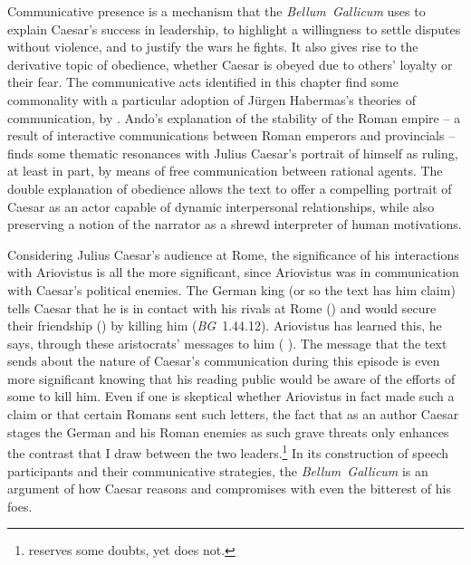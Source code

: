 \documentclass[12pt,letterpaper,oneside,final]{memoir}
\begin{document}
Communicative presence is a mechanism that the \emph{Bellum~Gallicum} uses to explain Caesar's success in leadership, to highlight a willingness to settle disputes without violence, and to justify the wars he fights. It also gives rise to the derivative topic of obedience, whether Caesar is obeyed due to others' loyalty or their fear. The communicative acts identified in this chapter find some commonality with a particular adoption of Jürgen Habermas's theories of communication, by \textcite[73--80]{ando2000}. Ando's explanation of the stability of the Roman empire -- a result of interactive communications between Roman emperors and provincials -- finds some thematic resonances with Julius Caesar's portrait of himself as ruling, at least in part, by means of free communication between rational agents. The double explanation of obedience allows the text to offer a compelling portrait of Caesar as an actor capable of dynamic interpersonal relationships, while also preserving a notion of the narrator as a shrewd interpreter of human motivations.

Considering Julius Caesar's audience at Rome, the significance of his interactions with Ariovistus is all the more significant, since Ariovistus was in communication with Caesar's political enemies. The German king (or so the text has him claim) tells Caesar that he is in contact with his rivals at Rome () and would secure their friendship () by killing him (\emph{BG}~1.44.12). Ariovistus has learned this, he says, through these aristocrats' messages to him ( ). The message that the text sends about the nature of Caesar's communication during this episode is even more significant knowing that his reading public would be aware of the efforts of some to kill him. Even if one is skeptical whether Ariovistus in fact made such a claim or that certain Romans sent such letters, the fact that as an author Caesar stages the German and his Roman enemies as such grave threats only enhances the contrast that I draw between the two leaders.\footnote{\textcite[228--229]{goldsworthy2006} reserves some doubts, yet \textcite[pp.~110--111, n.~1]{gelzer1968} does not.} In its construction of speech participants and their communicative strategies, the \emph{Bellum~Gallicum} is an argument of how Caesar reasons and compromises with even the bitterest of his foes.
\end{document}
